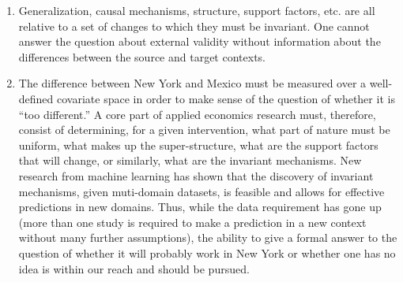 \documentclass[a4paper,12pt]{article}
\begin{document}
\begin{enumerate}
\item Generalization, causal mechanisms, structure, support factors, etc. are all relative to a set of changes to which they must be invariant. One cannot answer the question about external validity without information about the differences between the source and target contexts. 

\item The difference between New York and Mexico must be measured over a well-defined covariate space in order to make sense of the question of whether it is ``too different.'' A core part of applied economics research must, therefore, consist of determining, for a given intervention, what part of nature must be uniform, what makes up the super-structure, what are the support factors that will change, or similarly, what are the invariant mechanisms. New research from machine learning has shown that the discovery of invariant mechanisms, given muti-domain datasets, is feasible and allows for effective predictions in new domains. Thus, while the data requirement has gone up (more than one study is required to make a prediction in a new context without many further assumptions), the ability to give a formal answer to the question of whether it will probably work in New York or whether one has no idea is within our reach and should be pursued. 
\end{enumerate}













\end{document}
